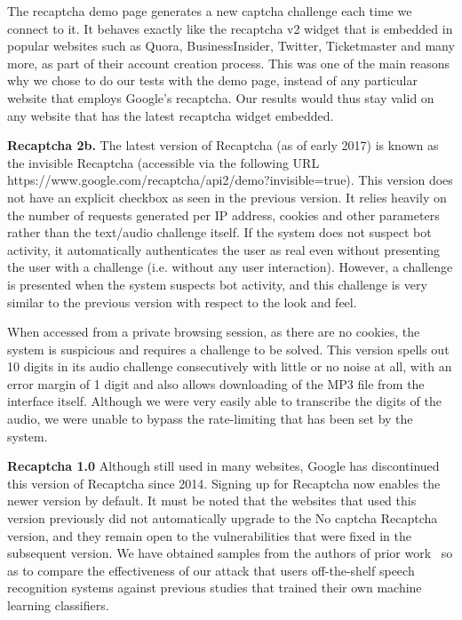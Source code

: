 The recaptcha demo page generates a new captcha challenge each time we connect to it. It behaves exactly like the recaptcha 
v2 widget that is embedded in popular websites such as Quora, BusinessInsider, Twitter, Ticketmaster and many more, as part 
of their account creation process. This was one of the main reasons why we chose to do our tests with the demo page, instead 
of any particular website that employs Google's recaptcha. Our results would thus stay valid on any website that has the latest 
recaptcha widget embedded.

\textbf{Recaptcha 2b.} The latest version of Recaptcha (as of early 2017) is known as the invisible Recaptcha 
(accessible via the following URL https://www.google.com/recaptcha/api2/\newline demo?invisible=true). This 
version does not have an explicit checkbox as seen in the previous version. It relies heavily on the number 
of requests generated per IP address, cookies and other parameters rather than the text/audio challenge itself. 
If the system does not suspect bot activity, it automatically authenticates the user as real even without presenting 
the user with a challenge (i.e. without any user interaction). However, a challenge is presented when the system 
suspects bot activity, and this challenge is very similar to the previous version with respect to the look and feel.

When accessed from a private browsing session, as there are no cookies, the system is suspicious and requires a challenge 
to be solved. This version spells out 10 digits in its audio challenge consecutively with little or no noise at all, with 
an error margin of 1 digit and also allows downloading of the MP3 file from the interface itself. Although we were very 
easily able to transcribe the digits of the audio, we were unable to bypass the rate-limiting that has been set by the system.

\textbf{Recaptcha 1.0} Although still used in many websites, Google has discontinued this version of Recaptcha since 2014. 
Signing up for Recaptcha now enables the newer version by default. It must be
noted that the websites that used this version previously did not automatically upgrade to the No 
captcha Recaptcha version, and they remain open to the vulnerabilities that were fixed in the subsequent 
version. We have obtained  samples from the authors of prior work~\cite{meutzner2014using} so as to 
compare the effectiveness of our attack that users off-the-shelf speech recognition systems against previous 
studies that trained their own machine learning classifiers.

